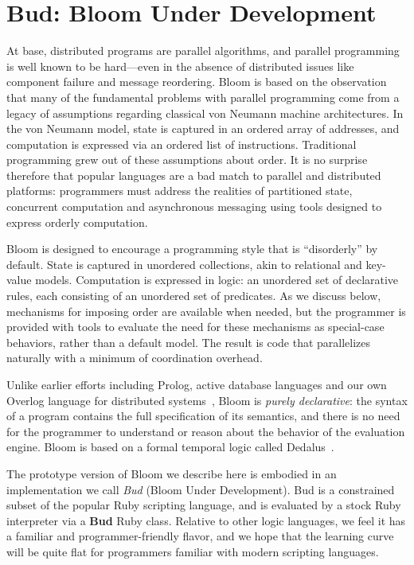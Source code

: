 \section{Bud: Bloom Under Development}
\label{sec:lang}
At base, distributed programs are parallel algorithms, and parallel programming is well known to be hard---even in the absence of distributed issues like component failure and message reordering.  Bloom is based on the observation that many of the fundamental problems with parallel programming come from a legacy of assumptions regarding classical von Neumann machine architectures.  In the von Neumann model, state is captured in an ordered array of addresses, and computation is expressed via an ordered list of instructions.  Traditional programming grew out of these assumptions about order.  It is no surprise therefore that popular languages are a bad match to parallel and distributed platforms: programmers must address the realities of partitioned state, concurrent computation and asynchronous messaging using tools designed to express orderly computation.

Bloom is designed to encourage a programming style that is ``disorderly'' by default.  State is captured in unordered collections, akin to relational and key-value models.  Computation is expressed in logic: an unordered set of declarative rules, each consisting of an unordered set of predicates.  As we discuss below, mechanisms for imposing order are available when needed, but the programmer is provided with tools to evaluate the need for these mechanisms as special-case behaviors, rather than a default model.  The result is code that parallelizes naturally with a minimum of coordination overhead.
 
Unlike earlier efforts including Prolog, active database languages%
and our own Overlog language for distributed systems~\cite{p2}, Bloom is {\em purely declarative}: the syntax of a program contains the full specification of its semantics, and there is no need for the programmer to understand or reason about the behavior of the evaluation engine.  Bloom is based on a formal temporal logic called Dedalus~\cite{dedalus-techr}.

The prototype version of Bloom we describe here is embodied in an implementation we call {\em Bud} (Bloom Under Development).  Bud is a constrained subset of the popular Ruby scripting language, and is evaluated by a stock Ruby interpreter via a \textbf{Bud} Ruby class.  Relative to other logic languages, we feel it has a familiar and programmer-friendly flavor, and we hope that the learning curve will be quite flat for programmers familiar with modern scripting languages.

